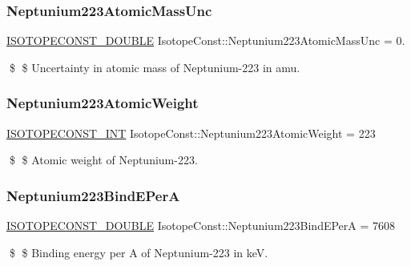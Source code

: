 \subsubsection{\texorpdfstring{Neptunium223\+Atomic\+Mass\+Unc}{Neptunium223AtomicMassUnc}}
{\footnotesize\ttfamily \mbox{\hyperlink{group___isotope_const-_macros_ga8f45a7272ce02c0b4c65c44636ed719a}{I\+S\+O\+T\+O\+P\+E\+C\+O\+N\+S\+T\+\_\+\+D\+O\+U\+B\+LE}} Isotope\+Const\+::\+Neptunium223\+Atomic\+Mass\+Unc = 0.}

\$ \$ Uncertainty in atomic mass of Neptunium-\/223 in amu. \mbox{\label{group___isotope_const-_neptunium-_np223_gac0cee0bbd2a0ad1eaa1f925a5a4f72f8}} 
\subsubsection{\texorpdfstring{Neptunium223\+Atomic\+Weight}{Neptunium223AtomicWeight}}
{\footnotesize\ttfamily \mbox{\hyperlink{group___isotope_const-_macros_ga5f18360b3e99483a35c32d789e62621c}{I\+S\+O\+T\+O\+P\+E\+C\+O\+N\+S\+T\+\_\+\+I\+NT}} Isotope\+Const\+::\+Neptunium223\+Atomic\+Weight = 223}

\$ \$ Atomic weight of Neptunium-\/223. \mbox{\label{group___isotope_const-_neptunium-_np223_gaa55519b58c1eaaa12d9e4b3b97e47d5e}} 
\subsubsection{\texorpdfstring{Neptunium223\+Bind\+E\+PerA}{Neptunium223BindEPerA}}
{\footnotesize\ttfamily \mbox{\hyperlink{group___isotope_const-_macros_ga8f45a7272ce02c0b4c65c44636ed719a}{I\+S\+O\+T\+O\+P\+E\+C\+O\+N\+S\+T\+\_\+\+D\+O\+U\+B\+LE}} Isotope\+Const\+::\+Neptunium223\+Bind\+E\+PerA = 7608}

\$ \$ Binding energy per A of Neptunium-\/223 in keV. \mbox{\label{group___isotope_const-_neptunium-_np223_gad3c947306aeb5cc5cce028e7a5db6c2b}} 
